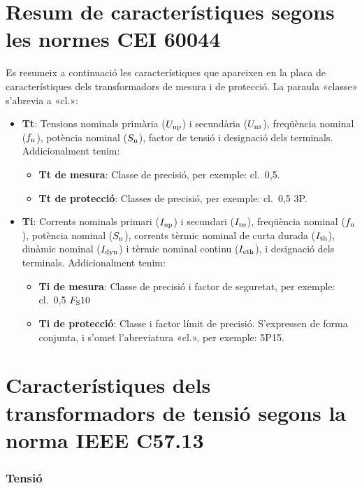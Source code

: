 \section{Resum de característiques segons les normes CEI 60044}

Es resumeix a continuació les característiques que apareixen en la placa de característiques dels transformadors de mesura i de protecció. La paraula
«classe» s'abrevia a «cl.»:

\begin{itemize}
   \item \textbf{Tt}: Tensions nominals  primària ($U_\mathrm{np}$) i secundària ($U_\mathrm{ns}$), freqüència nominal ($f_\mathrm{n}$),
    potència nominal ($S_\mathrm{n}$), factor de tensió i     designació dels terminals. Addicionalment tenim:
       \begin{itemize}
           \item \textbf{Tt de mesura}: Classe de precisió, per  exemple: cl.~0,5.
           \item \textbf{Tt de protecció}: Classes de precisió, per  exemple: cl.~0,5 3P.
        \end{itemize}
    \item \textbf{Ti}: Corrents nominals primari ($I_\mathrm{np}$) i secundari ($I_\mathrm{ns}$), freqüència nominal ($f_\mathrm{n}$),
     potència nominal ($S_\mathrm{n}$),  corrents tèrmic nominal de curta durada ($I_\mathrm{th}$), dinàmic nominal ($I_\mathrm{dyn}$) i tèrmic nominal continu ($I_\mathrm{cth}$), i     designació dels terminals. Addicionalment tenim:
        \begin{itemize}
           \item \textbf{Ti de mesura}: Classe de precisió i factor de seguretat, per exemple: cl.~0,5 $F_\mathrm{S} 10$
           \item \textbf{Ti de protecció}: Classe i factor límit de precisió. S'expressen de forma conjunta, i s'omet l'abreviatura «cl.»,  per exemple: 5P15.
        \end{itemize}
\end{itemize}


\section{Característiques dels transformadors de tensió segons la norma IEEE C57.13}

\subsubsection{Tensió}

